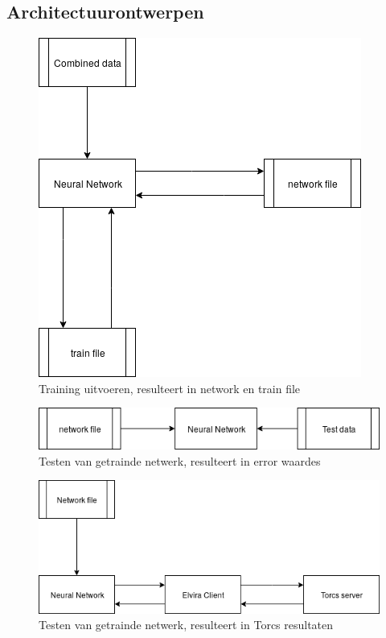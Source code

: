 \documentclass{article}
\begin{document}
\subsection{Architectuurontwerpen}
\begin{figure}[h!]
\centering
\includegraphics[scale=0.5]{train.png}
\caption{Training uitvoeren, resulteert in network en train file}
\end{figure}
\bigskip
\begin{figure}[h!]
\centering
\includegraphics[scale=0.5]{test.png}
\caption{Testen van getrainde netwerk, resulteert in error waardes}
\end{figure}
\bigskip
\begin{figure}[h!]
\centering
\includegraphics[scale=0.5]{runintorcs.png}
\caption{Testen van getrainde netwerk, resulteert in Torcs resultaten}
\end{figure}

\pagebreak

\end{document}
